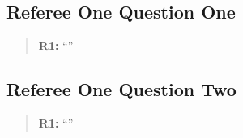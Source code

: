 \documentclass[12pt,english]{article}
\begin{document}
\blindtext

\subsection{Referee One Question One}
\begin{quotation}
\textbf{R1: }\enquote{\blindtext}
\end{quotation}

\Blindtext

\subsection{Referee One Question Two}
\begin{quotation}
\textbf{R1: }\enquote{\blindtext}
\end{quotation}

\Blindtext
\end{document}
